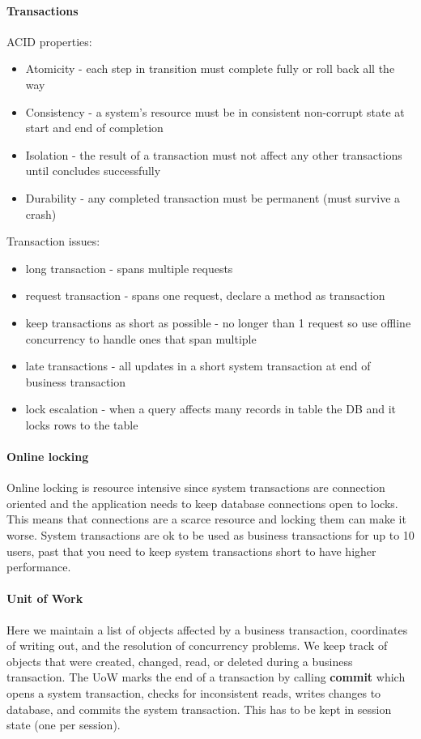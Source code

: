 \documentclass{article}
\begin{document}
\paragraph{Transactions} %
\label{par:transactions}
ACID properties:
\begin{itemize}
    \item Atomicity - each step in transition must complete fully or roll back all the way
    \item Consistency - a system's resource must be in consistent non-corrupt state at start and end of completion
    \item Isolation - the result of a transaction must not affect any other transactions until concludes successfully
    \item Durability - any completed transaction must be permanent (must survive a crash)
\end{itemize}

Transaction issues:
\begin{itemize}
    \item long transaction - spans multiple requests
    \item request transaction - spans one request, declare a method as transaction
    \item keep transactions as short as possible - no longer than 1 request so use offline concurrency to handle ones that span multiple
    \item late transactions - all updates in a short system transaction at end of business transaction
    \item lock escalation - when a query affects many records in table the DB and it locks rows to the table
\end{itemize}

\paragraph{Online locking} %
\label{par:online_locking}
Online locking is resource intensive since system transactions are connection oriented and the application needs to keep database connections open to locks. This means that connections are a scarce resource and locking them can make it worse. System transactions are ok to be used as business transactions for up to 10 users, past that you need to keep system transactions short to have higher performance.
\paragraph{Unit of Work} %
\label{par:unit_of_work}
Here we maintain a list of objects affected by a business transaction, coordinates of writing out, and the resolution of concurrency problems. We keep track of objects that were created, changed, read, or deleted during a business transaction. The UoW marks the end of a transaction by calling \textbf{commit} which opens a system transaction, checks for inconsistent reads, writes changes to database, and commits the system transaction. This has to be kept in session state (one per session).
\end{document}
